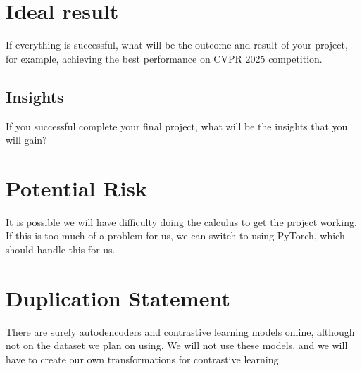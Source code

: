 \documentclass{article}
\begin{document}
\section{Ideal result}
{\color{red}
If everything is successful, what will be the outcome and result of your project, for example, achieving the best performance on CVPR 2025 competition.
}

\subsection{Insights}
{\color{red}
If you successful complete your final project, what will be the insights that you will gain?
}

\section{Potential Risk}
It is possible we will have difficulty doing the calculus to get the project working. If this is too much of a problem for us, we can switch to using PyTorch, which should handle this for us.  

\section{Duplication Statement}


There are surely autodencoders and contrastive learning models online, although not on the dataset we plan on using.  We will not use these models, and we will have to create our own transformations for contrastive learning.



\end{document}
